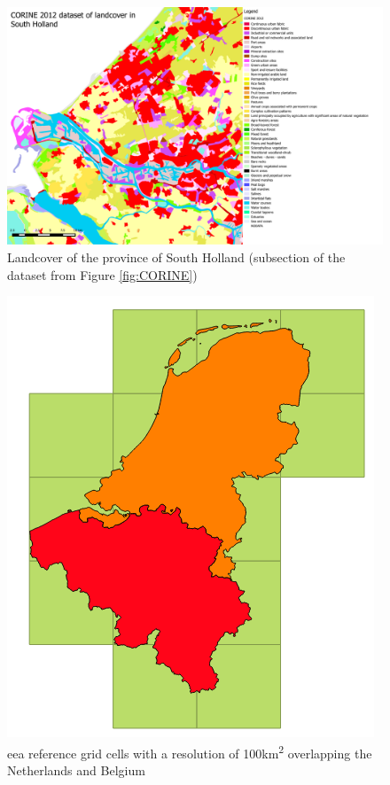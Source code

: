 \begin{figure}
	\centering
	\includegraphics[width=1\linewidth]{figs/CORINE_NL_BE_color_zoom.PDF}
	\caption{Landcover of the province of South Holland (subsection of the dataset from Figure \ref{fig:CORINE})}
	\label{fig:CORINEZOOM}
\end{figure}

\begin{figure}
	\centering
	\includegraphics[width=0.7\linewidth]{figs/EEA100km.png}
	\caption{\ac{eea} reference grid cells with a resolution of 100km\textsuperscript{2} overlapping the Netherlands and Belgium}
	\label{fig:100KM}
\end{figure}

